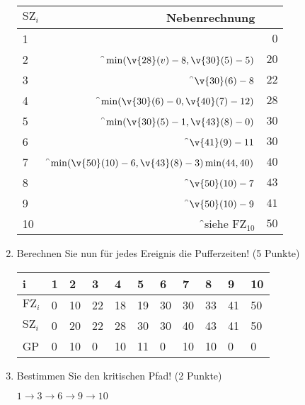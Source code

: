 \documentclass{lehramt-informatik-aufgabe}
\begin{document}
\begin{enumerate}
\begin{antwort}
\begin{tabular}{|l|r|r|}
\hline
$\text{SZ}_i$ & Nebenrechnung & \\\hline\hline
1 & & $0$ \\\hline
2 & \f$\min(\v{28}(v) - 8, \v{30}(5) - 5)$               & $20$ \\\hline
3 & \f$\v{30}(6) - 8$                                    & $22$ \\\hline
4 & \f$\min(\v{30}(6) - 0, \v{40}(7) - 12)$              & $28$ \\\hline
5 & \f$\min(\v{30}(5) - 1, \v{43}(8) - 0)$               & $30$ \\\hline
6 & \f$\v{41}(9) - 11$                                   & $30$ \\\hline
7 & \f$\min(\v{50}(10) - 6, \v{43}(8) - 3) \min(44, 40)$ & $40$ \\\hline
8 & \f$\v{50}(10) - 7$                                   & $43$ \\\hline
9 & \f$\v{50}(10) - 9$                                   & $41$ \\\hline
10 & \f{}siehe $\text{FZ}_10$                            & $50$ \\\hline
\end{tabular}
\end{antwort}


\item Berechnen Sie nun für jedes Ereignis die Pufferzeiten! (5 Punkte)

\begin{antwort}
\begin{tabular}{|l|l|l|l|l|l|l|l|l|l|l|}
\hline
i             & 1 & 2  & 3   & 4  & 5  & 6  & 7  & 8  & 9  & 10 \\\hline\hline
$\text{FZ}_i$ & 0 & 10 & 22  & 18 & 19 & 30 & 30 & 33 & 41 & 50 \\\hline
$\text{SZ}_i$ & 0 & 20 & 22  & 28 & 30 & 30 & 40 & 43 & 41 & 50 \\\hline
GP            & 0 & 10 & 0   & 10 & 11 & 0  & 10 & 10 & 0  & 0 \\\hline
\end{tabular}
\end{antwort}


\item Bestimmen Sie den kritischen Pfad! (2 Punkte)

\begin{antwort}
$1 \rightarrow 3 \rightarrow 6 \rightarrow 9 \rightarrow 10$


\end{antwort}
\end{enumerate}
\end{document}
